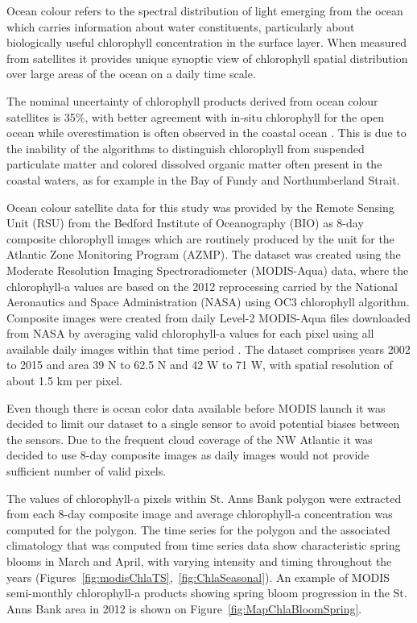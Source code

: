 \documentclass[letterpaper,portrait,11pt]{scrartcl}
\numberwithin{equation}{section}    %
\numberwithin{figure}{section}    %
\numberwithin{table}{section}       %
\begin{document}
Ocean colour refers to the spectral distribution of light emerging from the ocean which carries information about water constituents, particularly about biologically useful chlorophyll concentration in the surface layer. When measured from satellites it provides unique synoptic view of chlorophyll spatial distribution over large areas of the ocean on a daily time scale.

The nominal uncertainty of chlorophyll products derived from ocean colour satellites is 35\%, with better agreement with in-situ chlorophyll for the open ocean \parencite{moore2008impacts} while overestimation is often observed in the coastal ocean \parencite{darecki2004evaluation}. This is due to the inability of the algorithms to distinguish chlorophyll from suspended particulate matter and colored dissolved organic matter often present in the coastal waters, as for example in the Bay of Fundy and Northumberland Strait.

Ocean colour satellite data for this study was provided by the Remote Sensing Unit (RSU) from the Bedford Institute of Oceanography (BIO) as 8-day composite chlorophyll images which are routinely produced by the unit for the Atlantic Zone Monitoring Program (AZMP). The dataset was created using the Moderate Resolution Imaging Spectroradiometer (MODIS-Aqua) data, where the chlorophyll-a values are based on the 2012 reprocessing carried by the National Aeronautics and Space Administration (NASA) using OC3 chlorophyll algorithm. Composite images were created from daily Level-2 MODIS-Aqua files downloaded from NASA by averaging valid chlorophyll-a values for each pixel using all available daily images within that time period \parencite{Caverhill:2015:modis,feldman:2015}. The dataset comprises years 2002 to 2015 and area 39 N to 62.5 N and 42 W to 71 W, with spatial resolution of about 1.5 km per pixel.

Even though there is ocean color data available before MODIS launch it was decided to limit our dataset to a single sensor to avoid potential biases between the sensors. Due to the frequent cloud coverage of the NW Atlantic it was decided to use 8-day composite images as daily images would not provide sufficient number of valid pixels.

The values of chlorophyll-a pixels within St. Anns Bank polygon were extracted from each 8-day composite image and average chlorophyll-a concentration was computed for the polygon. The time series for the polygon and the associated climatology that was computed from time series data show characteristic spring blooms in March and April, with varying intensity and timing throughout the years (Figures~\ref{fig:modisChlaTS},~\ref{fig:ChlaSeasonal}). An example of MODIS semi-monthly chlorophyll-a products showing spring bloom progression in the St. Anns Bank area in 2012 is shown on Figure~\ref{fig:MapChlaBloomSpring}.
\end{document}
